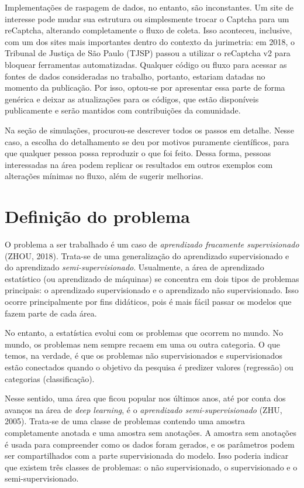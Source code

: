 \documentclass[12pt,twoside,brazilian]{book}
\begin{document}
Implementações de raspagem de dados, no entanto, são inconstantes. Um
site de interesse pode mudar sua estrutura ou simplesmente trocar o
Captcha para um reCaptcha, alterando completamente o fluxo de coleta.
Isso aconteceu, inclusive, com um dos sites mais importantes dentro do
contexto da jurimetria: em 2018, o Tribunal de Justiça de São Paulo
(TJSP) passou a utilizar o reCaptcha v2 para bloquear ferramentas
automatizadas. Qualquer código ou fluxo para acessar as fontes de dados
consideradas no trabalho, portanto, estariam datadas no momento da
publicação. Por isso, optou-se por apresentar essa parte de forma
genérica e deixar as atualizações para os códigos, que estão disponíveis
publicamente e serão mantidos com contribuições da comunidade.

Na seção de simulações, procurou-se descrever todos os passos em
detalhe. Nesse caso, a escolha do detalhamento se deu por motivos
puramente científicos, para que qualquer pessoa possa reproduzir o que
foi feito. Dessa forma, pessoas interessadas na área podem replicar os
resultados em outros exemplos com alterações mínimas no fluxo, além de
sugerir melhorias.

\hypertarget{definiuxe7uxe3o-do-problema}{%
\section{Definição do problema}\label{definiuxe7uxe3o-do-problema}}

O problema a ser trabalhado é um caso de \emph{aprendizado fracamente
supervisionado} (ZHOU, 2018). Trata-se de uma generalização do
aprendizado supervisionado e do aprendizado \emph{semi-supervisionado}.
Usualmente, a área de aprendizado estatístico (ou aprendizado de
máquinas) se concentra em dois tipos de problemas principais: o
aprendizado supervisionado e o aprendizado não supervisionado. Isso
ocorre principalmente por fins didáticos, pois é mais fácil passar os
modelos que fazem parte de cada área.

No entanto, a estatística evolui com os problemas que ocorrem no mundo.
No mundo, os problemas nem sempre recaem em uma ou outra categoria. O
que temos, na verdade, é que os problemas não supervisionados e
supervisionados estão conectados quando o objetivo da pesquisa é
predizer valores (regressão) ou categorias (classificação).

Nesse sentido, uma área que ficou popular nos últimos anos, até por
conta dos avanços na área de \emph{deep learning}, é o \emph{aprendizado
semi-supervisionado} (ZHU, 2005). Trata-se de uma classe de problemas
contendo uma amostra completamente anotada e uma amostra sem anotações.
A amostra sem anotações é usada para compreender como os dados foram
gerados, e os parâmetros podem ser compartilhados com a parte
supervisionada do modelo. Isso poderia indicar que existem três classes
de problemas: o não supervisionado, o supervisionado e o
semi-supervisionado.
\end{document}
